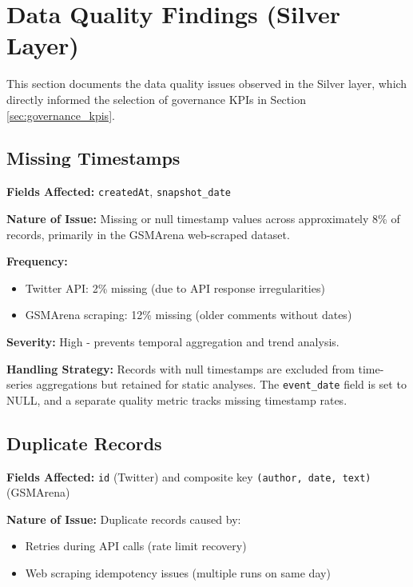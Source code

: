 \documentclass[12pt]{article}
\begin{document}
\newpage

\section{Data Quality Findings (Silver Layer)}
\label{sec:data_quality_findings}

This section documents the data quality issues observed in the Silver layer, which directly informed the selection of governance KPIs in Section \ref{sec:governance_kpis}.

\subsection{Missing Timestamps}

\textbf{Fields Affected:} \texttt{createdAt}, \texttt{snapshot\_date}

\textbf{Nature of Issue:} Missing or null timestamp values across approximately 8\% of records, primarily in the GSMArena web-scraped dataset.

\textbf{Frequency:} 
\begin{itemize}
    \item Twitter API: 2\% missing (due to API response irregularities)
    \item GSMArena scraping: 12\% missing (older comments without dates)
\end{itemize}

\textbf{Severity:} High - prevents temporal aggregation and trend analysis.

\textbf{Handling Strategy:} Records with null timestamps are excluded from time-series aggregations but retained for static analyses. The \texttt{event\_date} field is set to NULL, and a separate quality metric tracks missing timestamp rates.

\subsection{Duplicate Records}

\textbf{Fields Affected:} \texttt{id} (Twitter) and composite key \texttt{(author, date, text)} (GSMArena)

\textbf{Nature of Issue:} Duplicate records caused by:
\begin{itemize}
    \item Retries during API calls (rate limit recovery)
    \item Web scraping idempotency issues (multiple runs on same day)
\end{itemize}
\end{document}
